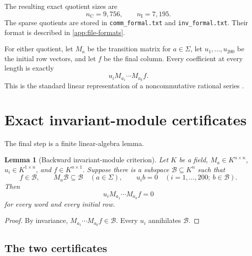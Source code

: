 \documentclass[10pt,letterpaper]{article}
\newtheorem{lemma}[theorem]{Lemma}
\newcommand{\code}[1]{\nolinkurl{#1}}
\begin{document}
The resulting exact quotient sizes are
\begin{equation}\label{eq:quotient-sizes}
 n_{\mathrm C}=9{,}756,
 \qquad
 n_{\mathrm I}=7{,}195.
\end{equation}
The sparse quotients are stored in \code{comm_formal.txt} and \code{inv_formal.txt}.  Their format is described in \cref{app:file-formats}.

For either quotient, let \(M_a\) be the transition matrix for \(a\in\Sigma\), let \(u_1,\ldots,u_{200}\) be the initial row vectors, and let \(f\) be the final column.  Every coefficient at every length is exactly
\begin{equation}\label{eq:rational-series}
 u_iM_{a_1}\cdots M_{a_k}f.
\end{equation}
This is the standard linear representation of a noncommutative rational series \citep{BerstelReutenauer2011}.

\section{Exact invariant-module certificates}\label{sec:certificates}

The final step is a finite linear-algebra lemma.

\begin{lemma}[Backward invariant-module criterion]\label{lem:module}
Let \(K\) be a field, \(M_a\in K^{n\times n}\), \(u_i\in K^{1\times n}\), and \(f\in K^{n\times1}\).  Suppose there is a subspace \(\mathcal B\subseteq K^n\) such that
\begin{equation}\label{eq:module-conditions}
 f\in\mathcal B,
 \qquad
 M_a\mathcal B\subseteq\mathcal B\quad(a\in\Sigma),
 \qquad
 u_i b=0\quad(i=1,\ldots,200;\ b\in\mathcal B).
\end{equation}
Then
\begin{equation}\label{eq:all-words-zero}
 u_iM_{a_1}\cdots M_{a_k}f=0
\end{equation}
for every word and every initial row.
\end{lemma}

\begin{proof}
By invariance, \(M_{a_1}\cdots M_{a_k}f\in\mathcal B\).  Every \(u_i\) annihilates \(\mathcal B\).
\end{proof}

\subsection{The two certificates}
\end{document}
